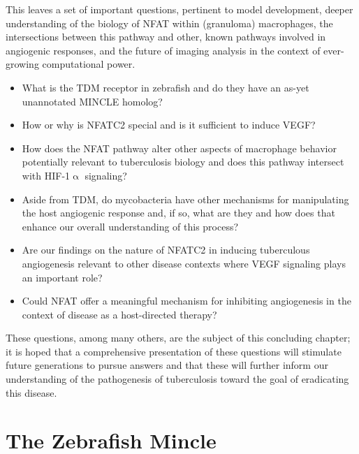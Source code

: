 This leaves a set of important questions, pertinent to model development, deeper understanding of the biology of NFAT within (granuloma) macrophages, the intersections between this pathway and other, known pathways involved in angiogenic responses, and the future of imaging analysis in the context of ever-growing computational power. 

\begin{itemize}
\item What is the TDM receptor in zebrafish and do they have an as-yet unannotated MINCLE homolog? 
\item How or why is NFATC2 special and is it sufficient to induce VEGF? 
\item How does the NFAT pathway alter other aspects of macrophage behavior potentially relevant to tuberculosis biology and does this pathway intersect with HIF-1$\upalpha$ signaling? 
\item Aside from TDM, do mycobacteria have other mechanisms for manipulating the host angiogenic response and, if so, what are they and how does that enhance our overall understanding of this process? 
\item Are our findings on the nature of NFATC2 in inducing tuberculous angiogenesis relevant to other disease contexts where VEGF signaling plays an important role? 
\item Could NFAT offer a meaningful mechanism for inhibiting angiogenesis in the context of disease as a host-directed therapy?
\end{itemize}

These questions, among many others, are the subject of this concluding chapter; it is hoped that a comprehensive presentation of these questions will stimulate future generations to pursue answers and that these will further inform our understanding of the pathogenesis of tuberculosis toward the goal of eradicating this disease.

\section{The Zebrafish Mincle}

